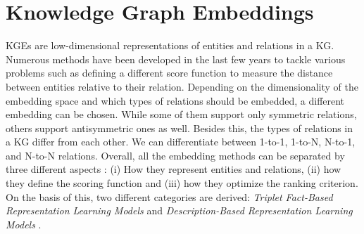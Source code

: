 \section{Knowledge Graph Embeddings} 
\acp{KGE} are low-dimensional representations of entities and relations in a \ac{KG}. 
Numerous methods have been developed in the last few years to tackle various problems such as defining a different score function to measure the distance between entities relative to their relation.
Depending on the dimensionality of the embedding space and which types of relations should be embedded, a different embedding can be chosen.
While some of them support only symmetric relations, others support antisymmetric ones as well. 
Besides this, the types of relations in a \ac{KG} differ from each other.
We can differentiate between 1-to-1, 1-to-N, N-to-1, and N-to-N relations.
Overall, all the embedding methods can be separated by three different aspects \cite{electronics9050750}:
(i) How they represent entities and relations, (ii) how they define the scoring function and (iii) how they optimize the ranking criterion.
On the basis of this, two different categories are derived:
\textit{Triplet Fact-Based Representation Learning Models} and \textit{Description-Based Representation Learning Models} \cite{electronics9050750}.

